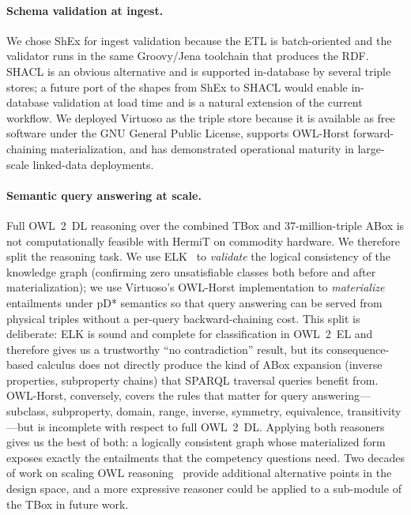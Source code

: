 \documentclass[11pt,a4paper]{article}
\begin{document}
\paragraph{Schema validation at ingest.}
We chose ShEx for ingest validation because the ETL is batch-oriented
and the validator runs in the same Groovy/Jena toolchain that
produces the RDF. SHACL is an obvious alternative and is supported
in-database by several triple stores; a future port of the shapes
from ShEx to SHACL would enable in-database validation at load time
and is a natural extension of the current workflow. We deployed
Virtuoso as the triple store because it is available as free
software under the GNU General Public License, supports OWL-Horst
forward-chaining materialization, and has demonstrated operational
maturity in large-scale linked-data deployments.

\paragraph{Semantic query answering at scale.}
Full OWL~2~DL reasoning over the combined TBox and 37-million-triple
ABox is not computationally feasible with HermiT on commodity
hardware. We therefore split the reasoning task. We use
ELK~\cite{elk} to \emph{validate} the logical consistency of the
knowledge graph (confirming zero unsatisfiable classes both before
and after materialization); we use Virtuoso's OWL-Horst
implementation to \emph{materialize} entailments under pD* semantics
so that query answering can be served from physical triples without
a per-query backward-chaining cost. This split is deliberate: ELK
is sound and complete for classification in OWL~2~EL and therefore
gives us a trustworthy ``no contradiction'' result, but its
consequence-based calculus does not directly produce the kind of
ABox expansion (inverse properties, subproperty chains) that
SPARQL traversal queries benefit from. OWL-Horst, conversely, covers
the rules that matter for query answering---subclass, subproperty,
domain, range, inverse, symmetry, equivalence, transitivity---but is
incomplete with respect to full OWL~2~DL. Applying both reasoners
gives us the best of both: a logically consistent graph whose
materialized form exposes exactly the entailments that the
competency questions need. Two decades of work on scaling OWL
reasoning~\cite{owlhorst,owl2profiles,elk} provide additional
alternative points in the design space, and a more expressive
reasoner could be applied to a sub-module of the TBox in future work.
\end{document}
